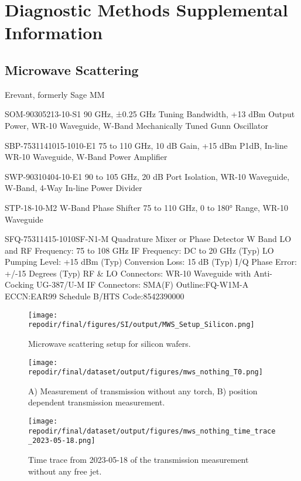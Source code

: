 \section{Diagnostic Methods Supplemental Information}

\subsection{Microwave Scattering}
Erevant, formerly Sage MM

SOM-90305213-10-S1
90 GHz, ±0.25 GHz Tuning Bandwidth, +13 dBm Output Power, WR-10 Waveguide, W-Band Mechanically Tuned Gunn Oscillator

SBP-7531141015-1010-E1
75 to 110 GHz, 10 dB Gain, +15 dBm P1dB, In-line WR-10 Waveguide, W-Band Power Amplifier

SWP-90310404-10-E1
90 to 105 GHz, 20 dB Port Isolation, WR-10 Waveguide, W-Band, 4-Way In-line Power Divider

STP-18-10-M2
W-Band Phase Shifter
75 to 110 GHz, 0 to 180° Range, WR-10 Waveguide

SFQ-75311415-1010SF-N1-M
Quadrature Mixer or Phase Detector W Band
LO and RF Frequency: 75 to 108 GHz
IF Frequency: DC to 20 GHz (Typ) 
LO Pumping Level: +15 dBm (Typ) 
Conversion Loss: 15 dB (Typ) 
I/Q Phase Error: +/-15 Degrees (Typ) 
RF & LO Connectors: WR-10 Waveguide with Anti-Cocking 
UG-387/U-M
IF Connectors: SMA(F) 
Outline:FQ-W1M-A
ECCN:EAR99
Schedule B/HTS Code:8542390000

\begin{figure}[]
\centering
\texttt{[image: \\repodir/final/figures/SI/output/MWS\_Setup\_Silicon.png]}
\caption{Microwave scattering setup for silicon wafers.}
\label{fig:SI_MWS_Setup_Silicon}
\end{figure}

\begin{figure}[]
\centering
\texttt{[image: \\repodir/final/dataset/output/figures/mws\_nothing\_T0.png]}
\caption{A) Measurement of transmission without any torch, B) position dependent transmission measurement.}
\label{fig:SI_MWS}
\end{figure}


\begin{figure}[]
\centering
\texttt{[image: \\repodir/final/dataset/output/figures/mws\_nothing\_time\_trace\_2023-05-18.png]}
\caption{Time trace from 2023-05-18 of the transmission measurement without any free jet.}
\label{fig:SI_MWS}
\end{figure}

